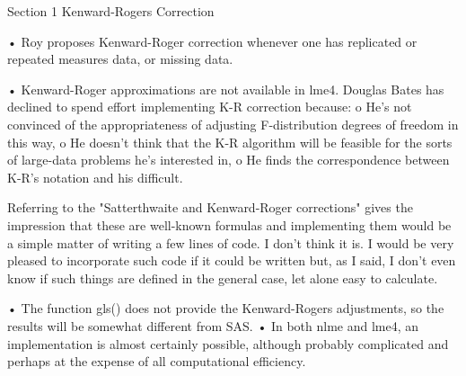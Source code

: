 Section 1 Kenward-Rogers Correction

•	Roy proposes Kenward-Roger correction whenever one has replicated or repeated measures data, or missing data.

•	Kenward-Roger approximations are not available in lme4. Douglas Bates has declined to spend effort implementing K-R correction because:
o	He's not convinced of the appropriateness of adjusting F-distribution degrees of freedom in this way, 
o	He doesn't think that the K-R algorithm will be feasible for the sorts of large-data problems he's interested in,
o	He finds the correspondence between K-R's notation and his difficult.

Referring to the "Satterthwaite and Kenward-Roger corrections" gives
 the impression that these are well-known formulas and implementing
 them would be a simple matter of writing a few lines of code.  I don't
 think it is.  
I would be very pleased to incorporate such code if it  could be written but, as I said, I don't even know if such things are defined in the general case, let alone easy to calculate.

•	The function gls() does not provide the Kenward-Rogers adjustments, so the results will be somewhat different from SAS.
•	In both nlme and lme4, an implementation is almost certainly possible, although probably complicated and perhaps at the expense of all computational efficiency.
